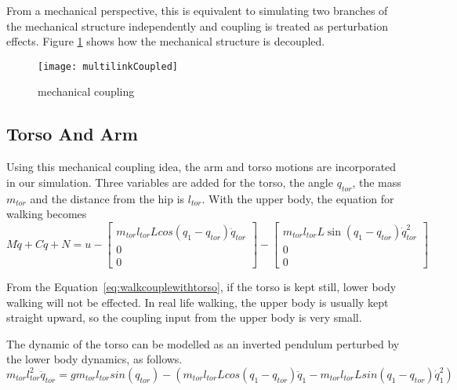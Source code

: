From a mechanical perspective, this is equivalent to simulating two branches of the mechanical structure independently and coupling is treated as perturbation effects.
Figure \ref{fig:mechcouple} shows how the mechanical structure is decoupled.
\begin{figure}[!htbp]
  \begin{center}
      \texttt{[image: multilinkCoupled]}
    \caption{mechanical coupling}
    \label{fig:mechcouple}
\end{center}
\end{figure}








\subsection{Torso And Arm}
Using this mechanical coupling idea, the arm and torso motions are incorporated in our simulation.
Three variables are added for the torso, the angle  $q_{tor}$,  the mass $m_{tor}$ and the distance from the hip is $l_{tor}$.
With the upper body, the equation for walking becomes
\begin{equation}
\label{eq:walkcouplewithtorso}
M\ddot{q}+C\dot{q}+N=u-\left[\begin{array}{c}
m_{tor}l_{tor}Lcos(q_{1}-q_{tor})\ddot{q}_{tor}\\
0\\
0\end{array}\right]-\left[\begin{array}{c}
m_{tor}l_{tor}L\sin(q_{1}-q_{tor})\dot{q}_{tor}^{2}\\
0\\
0\end{array}\right]
\end{equation}

From the Equation~\ref{eq:walkcouplewithtorso}, if the torso is kept still, lower body walking will not be effected.
In real life walking, the upper body is usually kept straight upward, so the coupling input from the upper body is very small.



The dynamic of the torso can be modelled as an inverted pendulum perturbed by the lower body dynamics, as follows.
\begin{equation}
\label{eq:torsodynamic}
m_{tor}l_{tor}^{2}\ddot{q}_{tor}=gm_{tor}l_{tor}sin(q_{tor})-(m_{tor}l_{tor}Lcos(q_{1}-q_{tor})\ddot{q}_{1}-m_{tor}l_{tor}Lsin(q_{1}-q_{tor})\dot{q}_{1}^{2})
\end{equation}

